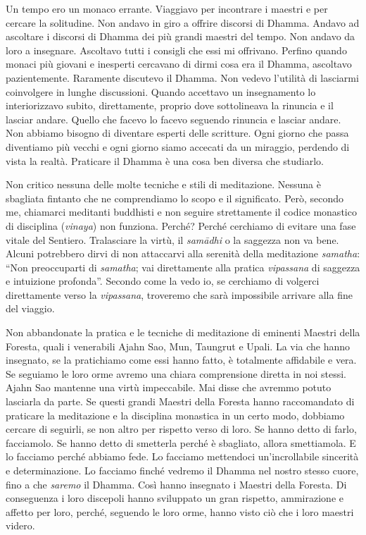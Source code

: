 Un tempo ero un monaco errante. Viaggiavo per incontrare i maestri e per
cercare la solitudine. Non andavo in giro a offrire discorsi di Dhamma.
Andavo ad ascoltare i discorsi di Dhamma dei più grandi maestri del
tempo. Non andavo da loro a insegnare. Ascoltavo tutti i consigli che
essi mi offrivano. Perfino quando monaci più giovani e inesperti
cercavano di dirmi cosa era il Dhamma, ascoltavo pazientemente.
Raramente discutevo il Dhamma. Non vedevo l'utilità di lasciarmi
coinvolgere in lunghe discussioni. Quando accettavo un insegnamento lo
interiorizzavo subito, direttamente, proprio dove sottolineava la
rinuncia e il lasciar andare. Quello che facevo lo facevo seguendo
rinuncia e lasciar andare. Non abbiamo bisogno di diventare esperti
delle scritture. Ogni giorno che passa diventiamo più vecchi e ogni
giorno siamo accecati da un miraggio, perdendo di vista la realtà.
Praticare il Dhamma è una cosa ben diversa che studiarlo.

Non critico nessuna delle molte tecniche e stili di meditazione. Nessuna
è sbagliata fintanto che ne comprendiamo lo scopo e il significato.
Però, secondo me, chiamarci meditanti buddhisti e non seguire
strettamente il codice monastico di disciplina (\emph{vinaya}) non
funziona. Perché? Perché cerchiamo di evitare una fase vitale del
Sentiero. Tralasciare la virtù, il \emph{samādhi} o la saggezza non va bene.
Alcuni potrebbero dirvi di non attaccarvi alla serenità della
meditazione \emph{samatha}: ``Non preoccuparti di \emph{samatha}; vai direttamente
alla pratica \emph{vipassana} di saggezza e intuizione profonda''. Secondo come
la vedo io, se cerchiamo di volgerci direttamente verso la \emph{vipassana},
troveremo che sarà impossibile arrivare alla fine del viaggio.

Non abbandonate la pratica e le tecniche di meditazione di eminenti
Maestri della Foresta, quali i venerabili Ajahn Sao, Mun, Taungrut e
Upali. La via che hanno insegnato, se la pratichiamo come essi hanno
fatto, è totalmente affidabile e vera. Se seguiamo le loro orme avremo
una chiara comprensione diretta in noi stessi. Ajahn Sao mantenne una
virtù impeccabile. Mai disse che avremmo potuto lasciarla da parte. Se
questi grandi Maestri della Foresta hanno raccomandato di praticare la
meditazione e la disciplina monastica in un certo modo, dobbiamo cercare
di seguirli, se non altro per rispetto verso di loro. Se hanno detto di
farlo, facciamolo. Se hanno detto di smetterla perché è sbagliato,
allora smettiamola. E lo facciamo perché abbiamo fede. Lo facciamo
mettendoci un'incrollabile sincerità e determinazione. Lo facciamo
finché vedremo il Dhamma nel nostro stesso cuore, fino a
che \emph{saremo} il Dhamma. Così hanno insegnato i Maestri della
Foresta. Di conseguenza i loro discepoli hanno sviluppato un gran
rispetto, ammirazione e affetto per loro, perché, seguendo le loro orme,
hanno visto ciò che i loro maestri videro.

